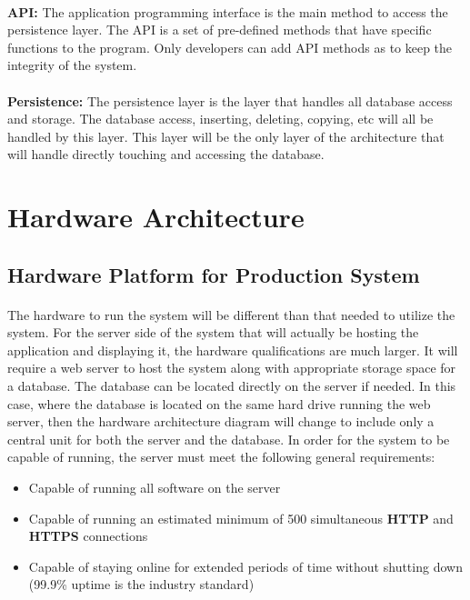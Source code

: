 \documentclass[letterpaper,12pt]{report}
\begin{document}
\paragraph{}\hspace{0.6cm}\textbf{API:} The application programming interface is the main method to access the persistence layer. The API is a set of pre-defined methods that have specific functions to the program. Only developers can add API methods as to keep the integrity of the system. 
\paragraph{}\hspace{0.6cm}\textbf{Persistence:} The persistence layer is the layer that handles all database access and storage. The database access, inserting, deleting, copying, etc will all be handled by this layer. This layer will be the only layer of the architecture that will handle directly touching and accessing the database. 

\pagebreak
\section{Hardware Architecture}

\subsection{Hardware Platform for Production System}
\paragraph*{}\hspace{0.6cm}The hardware to run the system will be different than that needed to utilize the system. For the server side of the system that will actually be hosting the application and displaying it, the hardware qualifications are much larger. It will require a web server to host the system along with appropriate storage space for a database. The database can be located directly on the server if needed. In this case, where the database is located on the same hard drive running the web server, then the hardware architecture diagram will change to include only a central unit for both the server and the database. In order for the system to be capable of running, the server must meet the following general requirements:
\begin{itemize}
 \item Capable of running all software on the server
 \item Capable of running an estimated minimum of 500 simultaneous \textbf{HTTP} and \textbf{HTTPS} connections
 \item Capable of staying online for extended periods of time without shutting down (99.9\% uptime is the industry standard)
\end{itemize}
\end{document}
